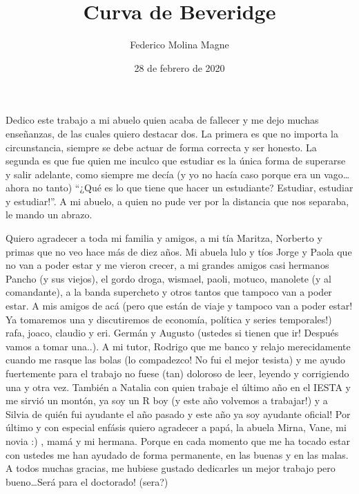 \documentclass[12pt,oneside]{reedthesis}
\title{Curva de Beveridge}
\author{Federico Molina Magne}
\date{28 de febrero de 2020}
\begin{document}
  \maketitle



\frontmatter %
\pagestyle{empty} %
  \begin{dedication}
    Dedico este trabajo a mi abuelo quien acaba de fallecer y me dejo muchas enseñanzas, de las cuales quiero destacar dos. La primera es que no importa la circunstancia, siempre se debe actuar de forma correcta y ser honesto. La segunda es que fue quien me inculco que estudiar es la única forma de superarse y salir adelante, como siempre me decía (y yo no hacía caso porque era un vago\ldots{} ahora no tanto) ``¿Qué es lo que tiene que hacer un estudiante? Estudiar, estudiar y estudiar!''. A mi abuelo, a quien no pude ver por la distancia que nos separaba, le mando un abrazo.
  \end{dedication}
  \begin{acknowledgements}
    Quiero agradecer a toda mi familia y amigos, a mi tía Maritza, Norberto y primas que no veo hace más de diez años. Mi abuela lulo y tíos Jorge y Paola que no van a poder estar y me vieron crecer, a mi grandes amigos casi hermanos Pancho (y sus viejos), el gordo droga, wismael, paoli, motuco, manolete (y al comandante), a la banda supercheto y otros tantos que tampoco van a poder estar. A mis amigos de acá (pero que están de viaje y tampoco van a poder estar! Ya tomaremos una y discutiremos de economía, política y series temporales!) rafa, joaco, claudio y eri. Germán y Augusto (ustedes si tienen que ir! Después vamos a tomar una..). A mi tutor, Rodrigo que me banco y relajo merecidamente cuando me rasque las bolas (lo compadezco! No fui el mejor tesista) y me ayudo fuertemente para el trabajo no fuese (tan) doloroso de leer, leyendo y corrigiendo una y otra vez. También a Natalia con quien trabaje el último año en el IESTA y me sirvió un montón, ya soy un R boy (y este año volvemos a trabajar!) y a Silvia de quién fui ayudante el año pasado y este año ya soy ayudante oficial!
    Por último y con especial enfásis quiero agradecer a papá, la abuela Mirna, Vane, mi novia :) , mamá y mi hermana. Porque en cada momento que me ha tocado estar con ustedes me han ayudado de forma permanente, en las buenas y en las malas.
    A todos muchas gracias, me hubiese gustado dedicarles un mejor trabajo pero bueno\ldots{}Será para el doctorado! (sera?)
  \end{acknowledgements}
\end{document}
